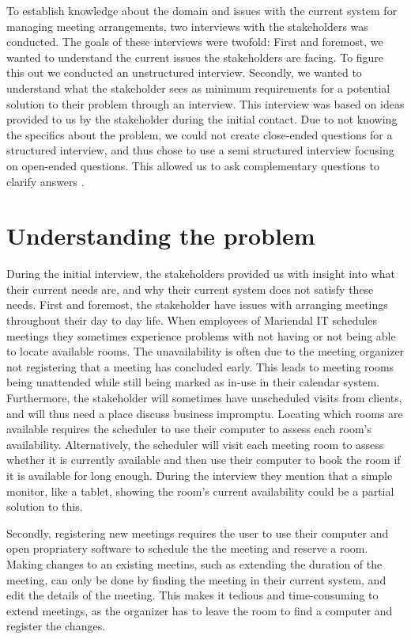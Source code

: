 To establish knowledge about the domain and issues with the current system for managing meeting arrangements, two interviews with the stakeholders was conducted.  
The goals of these interviews were twofold: 
First and foremost, we wanted  to understand the current issues the stakeholders are facing. 
To figure this out we conducted an unstructured interview\cite{robson2002real}.
Secondly, we wanted to understand what the stakeholder sees as minimum requirements for a potential solution to their problem through an interview.
This interview was based on ideas provided to us by the stakeholder during the initial contact.
Due to not knowing the specifics about the problem, we could not create close-ended questions for a structured interview, and thus chose to use a semi structured interview focusing on open-ended questions. This allowed us to ask complementary questions to clarify answers \cite{InterviewsNHS}.


\section{Understanding the problem} %
During the initial interview, the stakeholders provided us with insight into what their current needs are, and why their current system does not satisfy these needs.
First and foremost, the stakeholder have issues with arranging meetings throughout their day to day life.
When employees of Mariendal IT schedules meetings they sometimes experience problems with not having or not being able to locate available rooms.
The unavailability is often due to the meeting organizer not registering that a meeting has concluded early.
This leads to meeting rooms being unattended while still being marked as in-use in their calendar system.
Furthermore, the stakeholder will sometimes have unscheduled visits from clients, and will thus need a place discuss business impromptu. 
Locating which rooms are available requires the scheduler to use their computer to assess each room's availability.
Alternatively, the scheduler will visit each meeting room to assess whether it is currently available and then use their computer to book the room if it is available for long enough.
During the interview they mention that a simple monitor, like a tablet, showing the room's current availability could be a partial solution to this.

Secondly, registering new meetings requires the user to use their computer and open propriatery software to schedule the the meeting and reserve a room. Making changes to an existing meetins, such as extending the duration of the meeting, can only be done by finding the meeting in their current system, and edit the details of the meeting.
This makes it tedious and time-consuming to extend meetings, as the organizer has to leave the room to find a computer and register the changes.

